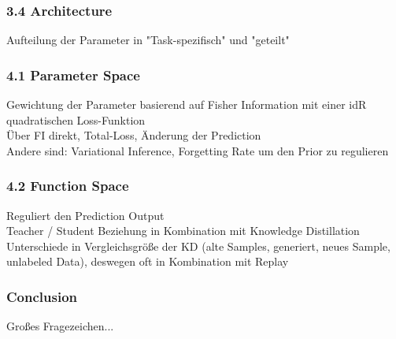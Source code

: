\documentclass{beamer}
\begin{document}
\begin{frame}
	\frametitle{3.4 Architecture}
	Aufteilung der Parameter in "Task-spezifisch" und "geteilt"
	
\end{frame}
\begin{frame}
	\frametitle{4.1 Parameter Space}
	Gewichtung der Parameter basierend auf Fisher Information mit einer idR quadratischen Loss-Funktion
	\\
	Über FI direkt, Total-Loss, Änderung der Prediction
	\\
	\vspace{0.5cm}
	Andere sind: Variational Inference, Forgetting Rate um den Prior zu regulieren
\end{frame}
\begin{frame}
	\frametitle{4.2 Function Space}
	Reguliert den Prediction Output
	\\
	Teacher / Student Beziehung  in Kombination mit Knowledge Distillation
	\\
	\vspace{0.5cm}
	Unterschiede in Vergleichsgröße der KD (alte Samples, generiert, neues Sample, unlabeled Data), deswegen oft in Kombination mit Replay
\end{frame}
\begin{frame}
	\frametitle{Conclusion}
	Großes Fragezeichen... 
\end{frame}
\end{document}
